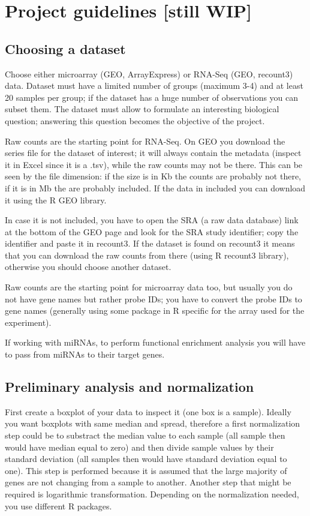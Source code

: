 \chapter*{Project guidelines [still WIP]}
  
  \section*{Choosing a dataset}
    Choose either microarray (GEO, ArrayExpress) or RNA-Seq (GEO, recount3) data. Dataset must have a limited number of groups (maximum 3-4) and at least 20 samples per group; if the dataset has a huge number of observations you can subset them. The dataset must allow to formulate an interesting biological question; answering this question becomes the objective of the project.

    Raw counts are the starting point for RNA-Seq. On GEO you download the series file for the dataset of interest; it will always contain the metadata (inspect it in Excel since it is a .tsv), while the raw counts may not be there. This can be seen by the file dimension: if the size is in Kb the counts are probably not there, if it is in Mb the are probably included. If the data in included you can download it using the R GEO library.

    In case it is not included, you have to open the SRA (a raw data database) link at the bottom of the GEO page and look for the SRA study identifier; copy the identifier and paste it in recount3. If the dataset is found on recount3 it means that you can download the raw counts from there (using R recount3 library), otherwise you should choose another dataset. 

    Raw counts are the starting point for microarray data too, but usually you do not have gene names but rather probe IDs; you have to convert the probe IDs to gene names (generally using some package in R specific for the array used for the experiment).

    If working with miRNAs, to perform functional enrichment analysis you will have to pass from miRNAs to their target genes. 

  \section*{Preliminary analysis and normalization}
    First create a boxplot of your data to inspect it (one box is a sample). Ideally you want boxplots with same median and spread, therefore a first normalization step could be to substract the median value to each sample (all sample then would have median equal to zero) and then divide sample values by their standard deviation (all samples then would have standard deviation equal to one). This step is performed because it is assumed that the large majority of genes are not changing from a sample to another.
    Another step that might be required is logarithmic transformation.
    Depending on the normalization needed, you use different R packages.
